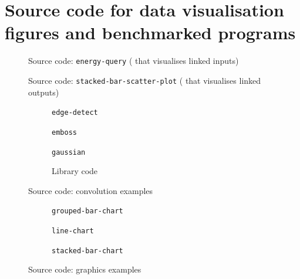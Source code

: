 \section{Source code for data visualisation figures and benchmarked programs}
\label{sec:apdx:evaluation-src-code}

\begin{figure}[h]
    \small
    {}
  \caption{Source code: \lstinline{energy-query} ( that visualises linked inputs)}
\end{figure}
\begin{figure}
    \small
    {}
  \caption{Source code: \lstinline{stacked-bar-scatter-plot} ( that visualises linked outputs)}
\end{figure}

\begin{figure}[h]
  \begin{subfigure}[position]{1\textwidth}
    \small
    {}
    \caption{\lstinline{edge-detect}}
  \end{subfigure}
  \begin{subfigure}[position]{1\textwidth}
    \small
    {}
    \caption{\lstinline{emboss}}
  \end{subfigure}
  \begin{subfigure}[position]{1\textwidth}
    \small
    {}
    \caption{\lstinline{gaussian}}
  \end{subfigure}
  \begin{subfigure}[position]{\textwidth}
    \small
    {}
    \caption{Library code}
  \end{subfigure}
  \caption{Source code: convolution examples}
\end{figure}


\begin{figure}[h]
  \centering
  \small
  \begin{subfigure}[position]{1\textwidth}
    \small
    {}
    \caption{\lstinline{grouped-bar-chart}}
  \end{subfigure}
  \begin{subfigure}[position]{1\textwidth}
    \small
    {}
    \caption{\lstinline{line-chart}}
  \end{subfigure}
  \begin{subfigure}[position]{1\textwidth}
    \small
    {}
    \caption{\lstinline{stacked-bar-chart}}
  \end{subfigure}
  \caption{Source code: graphics examples}
\end{figure}

